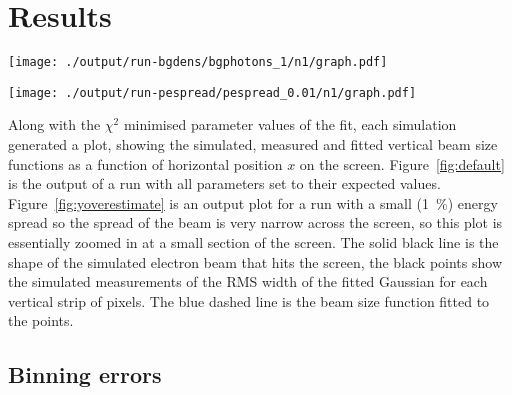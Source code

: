 
\section{Results}
\label{sec:results}

\begin{figure*}[!htbp]
	\begin{minipage}[t]{\columnwidth}
			\centering
			\texttt{[image: ./output/run-bgdens/bgphotons\_1/n1/graph.pdf]}
			\caption{
				The beam reconstruction (blue line) of a sumlation run with all the
				expected parameter values. \(E = \SI{1.3}{\giga\electronvolt}\),
				\(\sigma_E = \SI{0.4}{\giga\electronvolt}\), \(\epsilon =
				\SI{1}{\milli\meter\milli\radian}\)
			}
			\label{fig:default}
	\end{minipage}\hfill
	\begin{minipage}[t]{\columnwidth}
			\centering
			\texttt{[image: ./output/run-pespread/pespread\_0.01/n1/graph.pdf]}
			\caption{
				The beam reconstruction, consistently overestimates the vertical
				beam size. This run used a small percentage energy spread of
				\SI{1}{\percent}. With all other parameters set to their expected
				value.
			}
			\label{fig:yoverestimate}
	\end{minipage}
\end{figure*}

Along with the \(\chi^2\) minimised parameter values of the fit, each simulation
generated a plot, showing the simulated, measured and fitted vertical beam size
functions as a function of horizontal position \(x\) on the screen.
Figure~\ref{fig:default} is the output of a run with all parameters set to their
expected values.  Figure~\ref{fig:yoverestimate} is an output plot for a run
with a small (\SI{1}{\percent}) energy spread so the spread of the beam is very
narrow across the screen, so this plot is essentially zoomed in at a small
section of the screen. The solid black line is the shape of the simulated
electron beam that hits the screen, the black points show the simulated
measurements of the RMS width of the fitted Gaussian for each vertical strip of
pixels. The blue dashed line is the beam size function fitted to the points.

\subsection{Binning errors}

